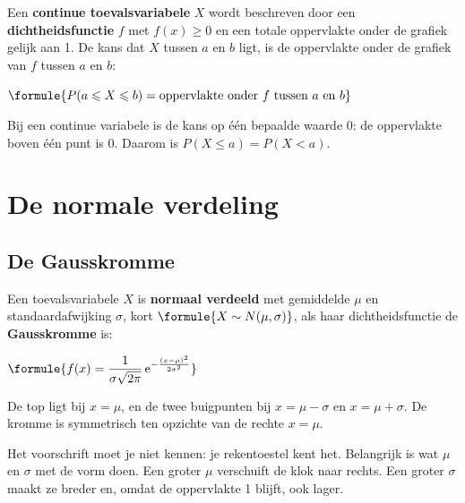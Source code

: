 \begin{theorie}
Een \textbf{\textcolor{accent}{continue toevalsvariabele}} $X$ wordt beschreven door een \textbf{\textcolor{accent}{dichtheidsfunctie}} $f$ met $f(x) \geqslant 0$ en een totale oppervlakte onder de grafiek gelijk aan 1. De kans dat $X$ tussen $a$ en $b$ ligt, is de oppervlakte onder de grafiek van $f$ tussen $a$ en $b$:

\vspace{1mm}
\qquad $\formule{P(a \leqslant X \leqslant b) = \text{oppervlakte onder } f \text{ tussen } a \text{ en } b}$
\end{theorie}

Bij een continue variabele is de kans op één bepaalde waarde 0: de oppervlakte boven één punt is 0. Daarom is $P(X \leqslant a) = P(X < a)$.

\begin{oefeningen}
\end{oefeningen}

\section{De normale verdeling}

\subsection{De Gausskromme}

\begin{theorie}
Een toevalsvariabele $X$ is \textbf{\textcolor{accent}{normaal verdeeld}} met gemiddelde $\mu$ en standaardafwijking $\sigma$, kort $\formule{X \sim N(\mu, \sigma)}$, als haar dichtheidsfunctie de \textbf{\textcolor{accent}{Gausskromme}} is:

\vspace{1mm}
\qquad $\formule{f(x) = \dfrac{1}{\sigma\sqrt{2\pi}}\, \mathrm{e}^{-\frac{(x - \mu)^2}{2\sigma^2}}}$

\vspace{1mm}
De top ligt bij $x = \mu$, en de twee buigpunten bij $x = \mu - \sigma$ en $x = \mu + \sigma$. De kromme is symmetrisch ten opzichte van de rechte $x = \mu$.
\end{theorie}

Het voorschrift moet je niet kennen: je rekentoestel kent het. Belangrijk is wat $\mu$ en $\sigma$ met de vorm doen. Een groter $\mu$ verschuift de klok naar rechts. Een groter $\sigma$ maakt ze breder en, omdat de oppervlakte 1 blijft, ook lager.

